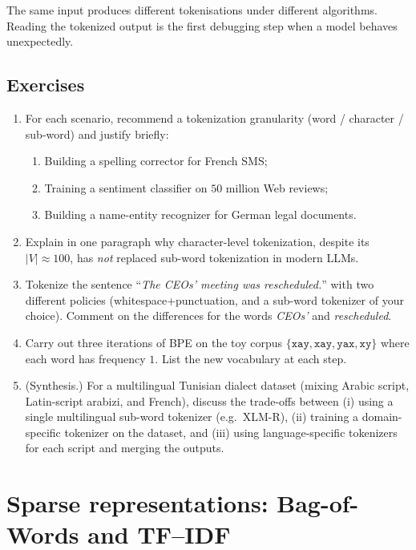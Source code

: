 The same input produces different tokenisations under different algorithms. Reading the tokenized output is the first debugging step when a model behaves unexpectedly.

\subsection{Exercises}
\begin{enumerate}
    \item For each scenario, recommend a tokenization granularity (word / character / sub-word) and justify briefly:
    \begin{enumerate}
        \item Building a spelling corrector for French SMS;
        \item Training a sentiment classifier on $50$ million Web reviews;
        \item Building a name-entity recognizer for German legal documents.
    \end{enumerate}
    \item Explain in one paragraph why character-level tokenization, despite its $|V| \approx 100$, has \emph{not} replaced sub-word tokenization in modern LLMs.
    \item Tokenize the sentence ``\emph{The CEOs' meeting was rescheduled.}'' with two different policies (whitespace+punctuation, and a sub-word tokenizer of your choice). Comment on the differences for the words \emph{CEOs'} and \emph{rescheduled}.
    \item Carry out three iterations of BPE on the toy corpus $\{\texttt{xay}, \texttt{xay}, \texttt{yax}, \texttt{xy}\}$ where each word has frequency $1$. List the new vocabulary at each step.
    \item (Synthesis.) For a multilingual Tunisian dialect dataset (mixing Arabic script, Latin-script arabizi, and French), discuss the trade-offs between (i) using a single multilingual sub-word tokenizer (e.g.\ XLM-R), (ii) training a domain-specific tokenizer on the dataset, and (iii) using language-specific tokenizers for each script and merging the outputs.
\end{enumerate}

\section{Sparse representations: Bag-of-Words and TF--IDF}
\label{sec:sparse}


